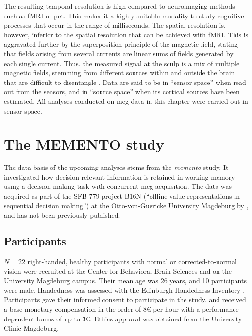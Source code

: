 The resulting temporal resolution is high compared to neuroimaging methods such as \gls{fMRI} or \gls{pet}.
This makes it a highly suitable modality to study cognitive processes that occur in the range of milliseconds.
The spatial resolution is, however, inferior to the spatial resolution that can be achieved with \gls{fMRI}.
This is aggravated further by the superposition principle of the magnetic field, stating that fields arising from several currents are linear sums of fields generated by each single current.
Thus, the measured signal at the sculp is a mix of multiple magnetic fields, stemming from different sources within and outside the brain that are difficult to disentangle \citep{hari2017primer}.
Data are said to be in ``sensor space'' when read out from the sensors, and in ``source space'' when its cortical sources have been estimated.
All analyses conducted on \gls{meg} data in this chapter were carried out in sensor space.



\section{The MEMENTO study}


The data basis of the upcoming analyses stems from the \textit{memento} study.
It investigated how decision-relevant information is retained in working memory using a decision making task with concurrent \gls{meg} acquisition.
The data was acquired as part of the SFB 779 project B16N (``offline value representations in sequential decision making'') at the Otto-von-Guericke University Magdeburg by \citet{kaiser}, and has not been previously published.


\subsection{Participants}

$N = 22$ right-handed, healthy participants with normal or corrected-to-normal vision were recruited at the Center for Behavioral Brain Sciences and on the University Magdeburg campus.
Their mean age was 26 years, and 10 participants were male.
Handedness was assessed with the Edinburgh Handedness Inventory \citep{oldfield1971assessment}.
Participants gave their informed consent to participate in the study, and received a base monetary compensation in the order of 8€ per hour with a performance-dependent bonus of up to 3€.
Ethics approval was obtained from the University Clinic Magdeburg.

